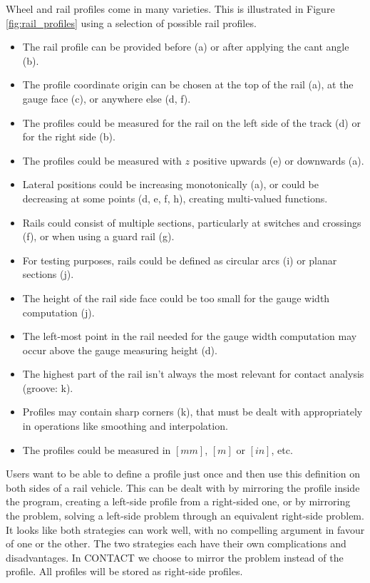\documentclass[12pt]{report}
\begin{document}
{Wheel and rail profiles come in many varieties. This is illustrated in Figure
\ref{fig:rail_profiles} using a selection of possible rail profiles.
\begin{itemize}
\item The rail profile can be provided before (a) or after applying the
        cant angle (b).
\item The profile coordinate origin can be chosen at the top of the
        rail (a), at the gauge face (c), or anywhere else (d, f).
\item The profiles could be measured for the rail on the left side of the
        track (d) or for the right side (b).
\item The profiles could be measured with $z$ positive upwards (e) or
        downwards (a).
\item Lateral positions could be increasing monotonically (a), or could be
        decreasing at some points (d, e, f, h), creating multi-valued functions.
\item Rails could consist of multiple sections, particularly at switches
        and crossings (f), or when using a guard rail (g).
\item For testing purposes, rails could be defined as circular arcs (i)
        or planar sections (j).
\item The height of the rail side face could be too small for the gauge width
        computation (j).
\item The left-most point in the rail needed for the gauge width computation
        may occur above the gauge measuring height (d).
\item The highest part of the rail isn't always the most relevant for
        contact analysis (groove: k).
\item Profiles may contain sharp corners (k), that must be dealt with
        appropriately in operations like smoothing and interpolation.
\item The profiles could be measured in $[mm]$, $[m]$ or $[in]$, etc.
\end{itemize}
Users want to be able to define a profile just once and then use this
definition on both sides of a rail vehicle. This can be dealt with by
mirroring the profile inside the program, creating a left-side profile from
a right-sided one, or by mirroring the problem, solving a left-side problem
through an equivalent right-side problem. It looks like both strategies can
work well, with no compelling argument in favour of one or the other. The
two strategies each have their own complications and disadvantages. In
CONTACT we choose to mirror the problem instead of the profile. All
profiles will be stored as right-side profiles.

}
\end{document}
